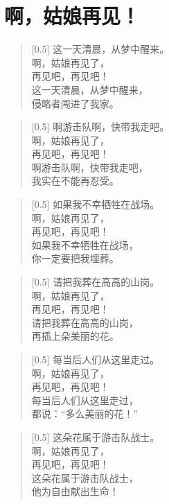 \documentclass[12pt,UTF-8,openany]{ctexbook}
\begin{document}
\chapter{啊，姑娘再见！}

\begin{Large}
    
    \begin{verse}[0.5\linewidth]
        这一天清晨，从梦中醒来。 \\
        啊，姑娘再见了， \\
        再见吧，再见吧！ \\
        这一天清晨，从梦中醒来， \\
        侵略者闯进了我家。
    \end{verse}
    
    
    \begin{verse}[0.5\linewidth]
        啊游击队啊，快带我走吧。 \\
        啊，姑娘再见了， \\
        再见吧，再见吧！ \\
        啊游击队啊，快带我走吧， \\
        我实在不能再忍受。
    \end{verse}
    
    
    \begin{verse}[0.5\linewidth]
        如果我不幸牺牲在战场。 \\
        啊，姑娘再见了， \\
        再见吧，再见吧！ \\
        如果我不幸牺牲在战场， \\
        你一定要把我埋葬。
    \end{verse}
    
    
    \begin{verse}[0.5\linewidth]
        请把我葬在高高的山岗。 \\
        啊，姑娘再见了， \\
        再见吧，再见吧！ \\
        请把我葬在高高的山岗， \\
        再插上朵美丽的花。
    \end{verse}
    
    
    \begin{verse}[0.5\linewidth]
        每当后人们从这里走过。 \\
        啊，姑娘再见了， \\
        再见吧，再见吧！ \\
        每当后人们从这里走过， \\
        都说：“多么美丽的花！”
    \end{verse}
    
    
    \begin{verse}[0.5\linewidth]
        这朵花属于游击队战士。 \\
        啊，姑娘再见了， \\
        再见吧，再见吧！ \\
        这朵花属于游击队战士， \\
        他为自由献出生命！
    \end{verse}
    
\end{Large}
\end{document}
